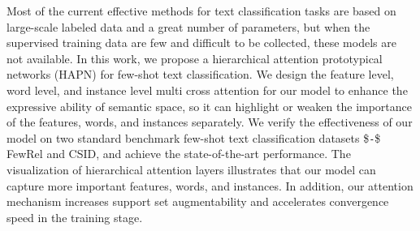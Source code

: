 Most of the current effective methods for text classification tasks are based on large-scale labeled data and a great number of parameters, but when the supervised training data are few and difficult to be collected, these models are not available. In this work, we propose a hierarchical attention prototypical networks (HAPN) for few-shot text classification. We design the feature level, word level, and instance level multi cross attention for our model to enhance the expressive ability of semantic space, so it can highlight or weaken the importance of the features, words, and instances separately. We verify the effectiveness of our model on two standard benchmark few-shot text classification datasets \$\verb|-|\$ FewRel and CSID, and achieve the state-of-the-art performance. The visualization of hierarchical attention layers illustrates that our model can capture more important features, words, and instances. In addition, our attention mechanism increases support set augmentability  and accelerates convergence speed in the training stage.